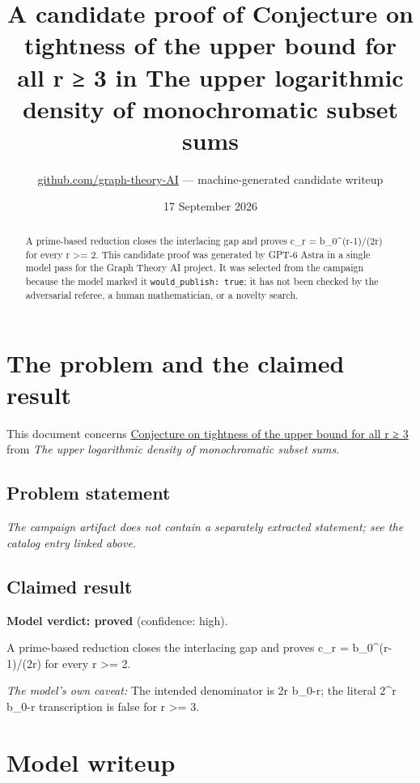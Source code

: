\documentclass[
  11pt,
  a4paper,
]{article}
\title{A candidate proof of Conjecture on tightness of the upper bound
for all r ≥ 3 in The upper logarithmic density of monochromatic subset
sums}
\author{\href{https://github.com/graph-theory-AI}{github.com/graph-theory-AI}
--- machine-generated candidate writeup}
\date{17 September 2026}
\begin{document}
\maketitle
\begin{abstract}
A prime-based reduction closes the interlacing gap and proves c\_r =
b\_0\^{}(r-1)/(2r) for every r \textgreater= 2. This candidate proof was
generated by GPT-6 Astra in a single model pass for the Graph Theory AI
project. It was selected from the campaign because the model marked it
\texttt{would\_publish:\ true}; it has not been checked by the
adversarial referee, a human mathematician, or a novelty search.
\end{abstract}

\section{The problem and the claimed
result}\label{the-problem-and-the-claimed-result}

This document concerns
\href{https://graph-theory-ai.github.io/graph-conjectures/arxiv/2105.15195__00/}{Conjecture
on tightness of the upper bound for all r ≥ 3} from \emph{The upper
logarithmic density of monochromatic subset sums}.

\subsection{Problem statement}\label{problem-statement}

\emph{The campaign artifact does not contain a separately extracted
statement; see the catalog entry linked above.}

\subsection{Claimed result}\label{claimed-result}

\textbf{Model verdict: proved} (confidence: high).

A prime-based reduction closes the interlacing gap and proves c\_r =
b\_0\^{}(r-1)/(2r) for every r \textgreater= 2.

\emph{The model's own caveat:} The intended denominator is 2r b\_0-r;
the literal 2\^{}r b\_0-r transcription is false for r \textgreater= 3.

\section{Model writeup}\label{model-writeup}
\end{document}
